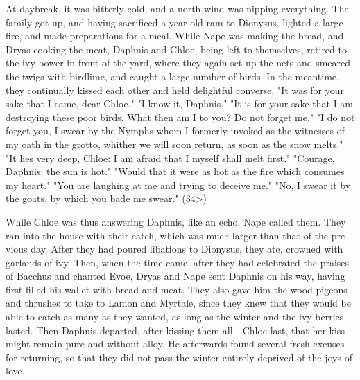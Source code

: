 \documentclass{book}
\begin{document}
\begin{pairs}
\begin{Rightside}
\begin{english}
  At daybreak, it was bitterly cold, and a north wind was nipping everything. The family got up, and having sacrificed a year old ram to Dionysus, lighted a large fire, and made preparations for a meal.  While Nape was making the bread, and Dryas cooking the meat, Daphnis and Chloe, being left to themselves, retired to the ivy bower in front of the yard, where they again set up the nets and smeared the twigs with birdlime, and caught a large number of birds.  In the meantime, they continually kissed each other and held delightful converse. "It was for your sake that I came, dear Chloe."  "I know it, Daphnis."  "It is for your sake that I am destroying these poor birds.  What then am I to you?  Do not forget me."  "I do not forget you, I swear by the Nymphs whom I formerly invoked as the witnesses of my oath in the grotto, whither we will soon return, as soon as the snow melts."  "It lies very deep, Chloe: I am afraid that I myself shall melt first."  "Courage, Daphnis: the sun is hot."  "Would that it were as hot as the fire which consumes my heart."  "You are laughing at me and trying to deceive me."  "No, I swear it by the goats, by which you bade me swear."  (34>)
\pend


  While Chloe was thus answering Daphnis, like an echo, Nape called them.  They ran into the house with their catch, which was much larger than that of the previous day.  After they had poured libations to Dionysus, they ate, crowned with garlands of ivy.  Then, when the time came, after they had celebrated the praises of Bacchus and chanted Evoe, Dryas and Nape sent Daphnis on his way, having first filled his wallet with bread and meat.  They also gave him the wood-pigeons and thrushes to take to Lamon and Myrtale, since they knew that they would be able to catch as many as they wanted, as long as the winter and the ivy-berries lasted.  Then Daphnis departed, after kissing them all - Chloe last, that her kiss might remain pure and without alloy.  He afterwards found several fresh excuses for returning, so that they did not pass the winter entirely deprived of the joys of love.
\pend



\end{english}
\end{Rightside}
\end{pairs}
\end{document}

